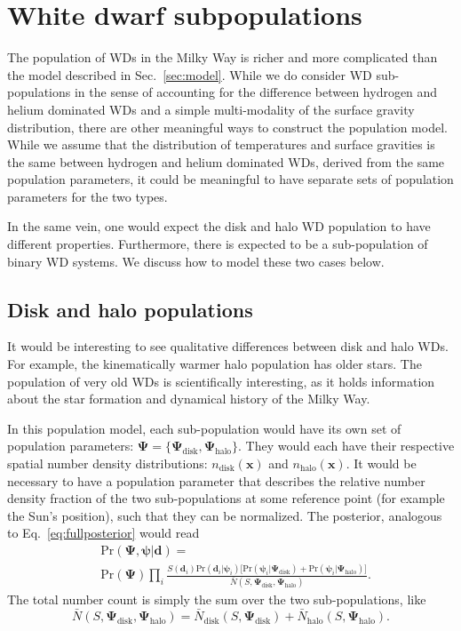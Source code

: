\documentclass[fleqn,usenatbib]{mnras}
\newcommand{\popp}{\boldsymbol{\Psi}}
\newcommand{\objp}{\boldsymbol{\psi}}
\newcommand{\data}{\mathbf{d}}
\newcommand{\pr}{\text{Pr}}
\begin{document}
\section{White dwarf subpopulations}\label{sec:subpopulations}

The population of WDs in the Milky Way is richer and more complicated than the model described in Sec.~\ref{sec:model}. While we do consider WD sub-populations in the sense of accounting for the difference between hydrogen and helium dominated WDs and a simple multi-modality of the surface gravity distribution, there are other meaningful ways to construct the population model. While we assume that the distribution of temperatures and surface gravities is the same between hydrogen and helium dominated WDs, derived from the same population parameters, it could be meaningful to have separate sets of population parameters for the two types.

In the same vein, one would expect the disk and halo WD population to have different properties. Furthermore, there is expected to be a sub-population of binary WD systems. We discuss how to model these two cases below.



\subsection{Disk and halo populations}

It would be interesting to see qualitative differences between disk and halo WDs. For example, the kinematically warmer halo population has older stars. The population of very old WDs is scientifically interesting, as it holds information about the star formation and dynamical history of the Milky Way.

In this population model, each sub-population would have its own set of population parameters: $\popp = \{ \popp_\text{disk},\popp_\text{halo} \}$. They would each have their respective spatial number density distributions: $n_\text{disk}(\mathbf{x})$ and $n_\text{halo}(\mathbf{x})$. It would be necessary to have a population parameter that describes the relative number density fraction of the two sub-populations at some reference point (for example the Sun's position), such that they can be normalized. The posterior, analogous to Eq.~\eqref{eq:fullposterior} would read
\begin{equation}\label{eq:posterior_disk_halo}
\begin{split}
	& \pr(\popp,\objp | \data ) = \\
	& \pr(\popp)
	\prod_i 
	\frac{S(\data_i) \pr(\data_i | \objp_i)
	\Big[ \pr(\objp_i | \popp_\text{disk})+\pr(\objp_i | \popp_\text{halo}) \Big] }
	{\bar{N}(S,\popp_\text{disk},\popp_\text{halo})}.
\end{split}
\end{equation}
The total number count is simply the sum over the two sub-populations, like
\begin{equation}
	\bar{N}(S,\popp_\text{disk},\popp_\text{halo})=\bar{N}_\text{disk}(S,\popp_\text{disk})+\bar{N}_\text{halo}(S,\popp_\text{halo}).
\end{equation}
\end{document}
